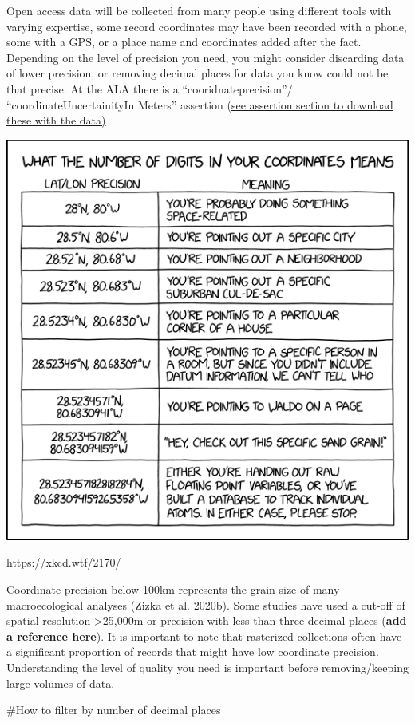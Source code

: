 \documentclass[
  letterpaper,
  DIV=11,
  numbers=noendperiod,
  oneside]{scrreprt}
\newenvironment{Shaded}{\begin{snugshade}}{\end{snugshade}}
\newcommand{\CommentTok}[1]{\textcolor[rgb]{0.37,0.37,0.37}{#1}}
\begin{document}
Open access data will be collected from many people using different
tools with varying expertise, some record coordinates may have been
recorded with a phone, some with a GPS, or a place name and coordinates
added after the fact. Depending on the level of precision you need, you
might consider discarding data of lower precision, or removing decimal
places for data you know could not be that precise. At the ALA there is
a ``cooridnateprecision''/ ``coordinateUncertainityIn Meters'' assertion
(\ul{see assertion section to download these with the data)}

\includegraphics{images/image-613988507.png}

https://xkcd.wtf/2170/

Coordinate precision below 100km represents the grain size of many
macroecological analyses (Zizka et al. 2020b). Some studies have used a
cut-off of spatial resolution \textgreater25,000m or precision with less
than three decimal places (\textbf{add a reference here}). It is
important to note that rasterized collections often have a significant
proportion of records that might have low coordinate precision.
Understanding the level of quality you need is important before
removing/keeping large volumes of data.

\begin{Shaded}
\begin{Highlighting}[]
\CommentTok{\#How to filter by number of decimal places}
\end{Highlighting}
\end{Shaded}
\end{document}
